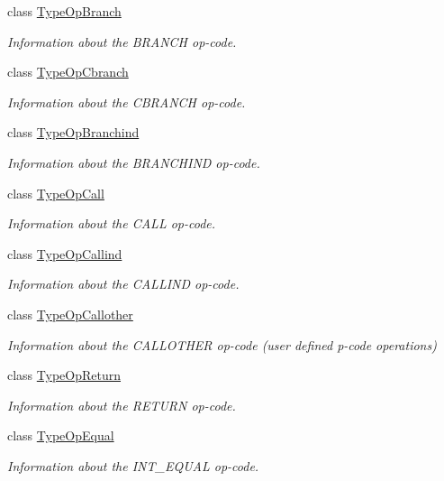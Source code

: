 \begin{DoxyCompactItemize}
class \mbox{\hyperlink{class_type_op_branch}{Type\+Op\+Branch}}
\begin{DoxyCompactList}\small\item\em Information about the B\+R\+A\+N\+CH op-\/code. \end{DoxyCompactList}\item 
class \mbox{\hyperlink{class_type_op_cbranch}{Type\+Op\+Cbranch}}
\begin{DoxyCompactList}\small\item\em Information about the C\+B\+R\+A\+N\+CH op-\/code. \end{DoxyCompactList}\item 
class \mbox{\hyperlink{class_type_op_branchind}{Type\+Op\+Branchind}}
\begin{DoxyCompactList}\small\item\em Information about the B\+R\+A\+N\+C\+H\+I\+ND op-\/code. \end{DoxyCompactList}\item 
class \mbox{\hyperlink{class_type_op_call}{Type\+Op\+Call}}
\begin{DoxyCompactList}\small\item\em Information about the C\+A\+LL op-\/code. \end{DoxyCompactList}\item 
class \mbox{\hyperlink{class_type_op_callind}{Type\+Op\+Callind}}
\begin{DoxyCompactList}\small\item\em Information about the C\+A\+L\+L\+I\+ND op-\/code. \end{DoxyCompactList}\item 
class \mbox{\hyperlink{class_type_op_callother}{Type\+Op\+Callother}}
\begin{DoxyCompactList}\small\item\em Information about the C\+A\+L\+L\+O\+T\+H\+ER op-\/code (user defined p-\/code operations) \end{DoxyCompactList}\item 
class \mbox{\hyperlink{class_type_op_return}{Type\+Op\+Return}}
\begin{DoxyCompactList}\small\item\em Information about the R\+E\+T\+U\+RN op-\/code. \end{DoxyCompactList}\item 
class \mbox{\hyperlink{class_type_op_equal}{Type\+Op\+Equal}}
\begin{DoxyCompactList}\small\item\em Information about the I\+N\+T\+\_\+\+E\+Q\+U\+AL op-\/code. \end{DoxyCompactList}\item 

\end{DoxyCompactItemize}
